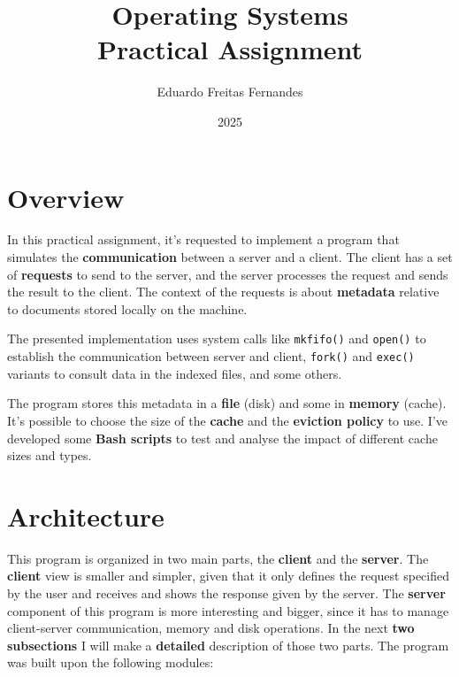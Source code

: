 \documentclass[a4paper, 11pt]{article}
\title{Operating Systems \\ Practical Assignment}
\author{Eduardo Freitas Fernandes}
\date{2025}
\begin{document}
\maketitle

\tableofcontents

\newpage

\section{Overview}

In this practical assignment, it's requested to implement a program that simulates the \textbf{communication} between a server and a client. The client has a set of \textbf{requests} to send to the server, and the server processes the request and sends the result to the client. The context of the requests is about \textbf{metadata} relative to documents stored locally on the machine.

The presented implementation uses system calls like \texttt{mkfifo()} and \texttt{open()} to establish the communication between server and client, \texttt{fork()} and \texttt{exec()} variants to consult data in the indexed files, and some others.

The program stores this metadata in a \textbf{file} (disk) and some in \textbf{memory} (cache). It's possible to choose the size of the \textbf{cache} and the \textbf{eviction policy} to use. I've developed some \textbf{Bash scripts} to test and analyse the impact of different cache sizes and types.


\section{Architecture} \label{sec:architecture}

This program is organized in two main parts, the \textbf{client} and the \textbf{server}. The \textbf{client} view is smaller and simpler, given that it only defines the request specified by the user and receives and shows the response given by the server. The \textbf{server} component of this program is more interesting and bigger, since it has to manage client-server communication, memory and disk operations. In the next \textbf{two subsections} I will make a \textbf{detailed} description of those two parts. The program was built upon the following modules:
\end{document}
